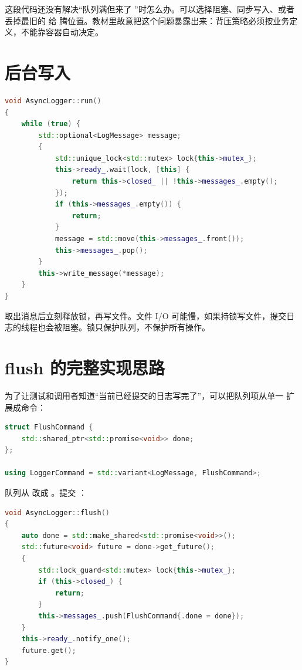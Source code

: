 这段代码还没有解决“队列满但来了 ”时怎么办。可以选择阻塞、同步写入、或者丢掉最旧的  给  腾位置。教材里故意把这个问题暴露出来：背压策略必须按业务定义，不能靠容器自动决定。

\section{后台写入}

\begin{lstlisting}[language=C++,caption={后台写日志}]
void AsyncLogger::run()
{
    while (true) {
        std::optional<LogMessage> message;
        {
            std::unique_lock<std::mutex> lock{this->mutex_};
            this->ready_.wait(lock, [this] {
                return this->closed_ || !this->messages_.empty();
            });
            if (this->messages_.empty()) {
                return;
            }
            message = std::move(this->messages_.front());
            this->messages_.pop();
        }
        this->write_message(*message);
    }
}
\end{lstlisting}

取出消息后立刻释放锁，再写文件。文件 I/O 可能慢，如果持锁写文件，提交日志的线程也会被阻塞。锁只保护队列，不保护所有操作。

\section{flush 的完整实现思路}

为了让测试和调用者知道“当前已经提交的日志写完了”，可以把队列项从单一  扩展成命令：

\begin{lstlisting}[language=C++,caption={日志队列命令}]
struct FlushCommand {
    std::shared_ptr<std::promise<void>> done;
};

using LoggerCommand = std::variant<LogMessage, FlushCommand>;
\end{lstlisting}

队列从  改成 。提交 ：

\begin{lstlisting}[language=C++,caption={提交 flush 命令}]
void AsyncLogger::flush()
{
    auto done = std::make_shared<std::promise<void>>();
    std::future<void> future = done->get_future();
    {
        std::lock_guard<std::mutex> lock{this->mutex_};
        if (this->closed_) {
            return;
        }
        this->messages_.push(FlushCommand{.done = done});
    }
    this->ready_.notify_one();
    future.get();
}
\end{lstlisting}

